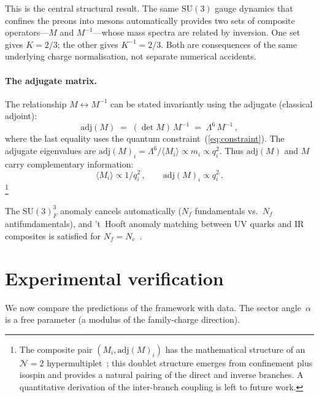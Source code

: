 \documentclass[preprint,12pt]{elsarticle}
\newcommand{\SU}{\mathrm{SU}}
\newcommand{\Nf}{N_{\!f}}
\newcommand{\Nc}{N_{\!c}}
\newcommand{\adj}{\mathrm{adj}}
\begin{document}
This is the central structural result.
The same $\SU(3)$ gauge dynamics that confines the
preons into mesons automatically provides two sets
of composite operators---$M$ and $M^{-1}$---whose
mass spectra are related by inversion.
One set gives $K = 2/3$; the other gives $K^{-1} = 2/3$.
Both are consequences of the same underlying
charge normalisation, not separate numerical accidents.

\paragraph{The adjugate matrix.}
The relationship $M \leftrightarrow M^{-1}$ can be
stated invariantly using the adjugate (classical adjoint):
\begin{equation}
  \adj(M) \;=\; (\det M)\,M^{-1}
  \;=\; \Lambda^6\,M^{-1}\,,
  \label{eq:adjugate}
\end{equation}
where the last equality uses the quantum
constraint~(\ref{eq:constraint}).
The adjugate eigenvalues are
$\adj(M)_i = \Lambda^6/\langle M_i\rangle
\propto m_i \propto q_i^2$.
Thus $\adj(M)$ and $M$ carry complementary information:
\begin{equation}
  \langle M_i\rangle \propto 1/q_i^2\,,
  \qquad
  \adj(M)_i \propto q_i^2\,.
  \label{eq:dual_pair}
\end{equation}%
\footnote{The composite pair $(M_i, \adj(M)_i)$ has the
mathematical structure of an $\mathcal{N}{=}2$
hypermultiplet~\cite{SeibergWitten:1994a};
this doublet structure emerges from confinement
plus isospin and provides a natural pairing
of the direct and inverse branches.
A quantitative derivation of the inter-branch
coupling is left to future work.}

The $\SU(3)_F^3$ anomaly cancels
automatically ($\Nf$ fundamentals vs.\ $\Nf$ antifundamentals),
and 't~Hooft anomaly matching between UV quarks and
IR composites is satisfied for
$\Nf = \Nc$~\cite{Csaki:1996zb}.

\section{Experimental verification}
We now compare the
predictions of the framework with data.
The sector angle~$\alpha$ is a free parameter
(a modulus of the family-charge direction).
\end{document}
